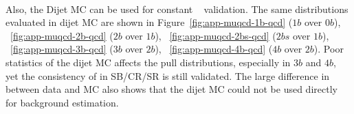 \paragraph{}
Also, the Dijet MC can be used for constant \muqcd~ validation. 
The same distributions evaluated in dijet MC are shown in Figure~\ref{fig:app-muqcd-1b-qcd} ($1b$ over $0b$), ~\ref{fig:app-muqcd-2b-qcd} ($2b$ over $1b$), ~\ref{fig:app-muqcd-2bs-qcd} ($2bs$ over $1b$), ~\ref{fig:app-muqcd-3b-qcd} ($3b$ over $2b$), ~\ref{fig:app-muqcd-4b-qcd} ($4b$ over $2b$).  
Poor statistics of the dijet MC affects the pull distributions, especially in $3b$ and $4b$, yet the consistency of \muqcd in SB/CR/SR is still validated.
The large difference in \muqcd between data and MC also shows that the dijet MC could not be used directly for background estimation.

